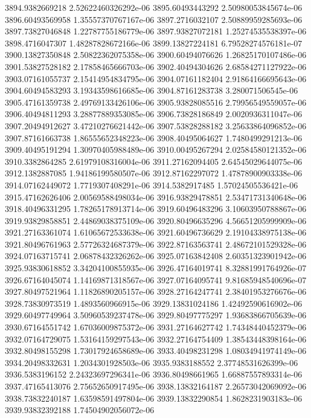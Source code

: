 {3894.9382669218 2.52622460326292e-06
3895.60493443292 2.50980053845674e-06
3896.60493569958 1.35557370767167e-06
3897.2716032107 2.50889959285693e-06
3897.73827046848 1.22787755186779e-06
3897.93827072181 1.25274535538397e-06
3898.4716047307 1.48287828672166e-06
3899.13827224181 6.79528274576181e-07
3900.13827350848 2.50822362075358e-06
3900.60494076626 1.26825170107486e-06
3901.53827528182 2.17858465666703e-06
3902.40494304626 2.68584271127922e-06
3903.07161055737 2.15414954834795e-06
3904.07161182404 2.91864166695643e-06
3904.60494583293 3.19343598616685e-06
3904.87161283738 3.280071506545e-06
3905.47161359738 2.49769133426106e-06
3905.93828085516 2.79956549559057e-06
3906.40494811293 3.28877889353085e-06
3906.73828186849 2.0020936311047e-06
3907.20494912627 3.47210276621442e-06
3907.53828288182 3.25633864096852e-06
3907.87161663738 1.86555652348223e-06
3908.40495064627 1.7480499291213e-06
3909.40495191294 1.30970405988489e-06
3910.00495267294 2.02584580121352e-06
3910.3382864285 2.61979108316004e-06
3911.27162094405 2.64545029644075e-06
3912.1382887085 1.94186199580507e-06
3912.87162297072 1.47878900903338e-06
3914.07162449072 1.7719307408291e-06
3914.5382917485 1.57024505536421e-06
3915.47162626406 2.00569588498034e-06
3916.93829478851 2.53471731340648e-06
3918.40496331295 1.78265178913714e-06
3919.60496483296 3.10603950788867e-06
3919.93829858851 2.44869038375109e-06
3920.80496635296 4.56651205999909e-06
3921.27163361074 1.61065672533638e-06
3921.60496736629 2.19104338975138e-06
3921.80496761963 2.57726324687379e-06
3922.87163563741 2.48672101529328e-06
3924.07163715741 2.06878432326262e-06
3925.07163842408 2.60351323901942e-06
3925.93830618852 3.34204100855935e-06
3926.47164019741 8.32881991764926e-07
3926.67164045074 1.14169871318567e-06
3927.07164095741 9.81685948540696e-07
3927.80497521964 1.11826890205157e-06
3928.27164247741 2.38401953276676e-06
3928.73830973519 1.4893560966915e-06
3929.13831024186 1.42492590616902e-06
3929.60497749964 3.50960539237478e-06
3929.80497775297 1.93683866705639e-06
3930.67164551742 1.67036009875372e-06
3931.27164627742 1.74348440452379e-06
3932.07164729075 1.53164159297543e-06
3932.27164754409 1.38543448398164e-06
3932.80498155298 1.73017924658689e-06
3933.40498231298 1.08034941974149e-06
3934.20498332631 1.2034301928503e-06
3935.9383188552 2.37748531626399e-06
3936.5383196152 2.24323697296341e-06
3936.80498661965 1.66887557893314e-06
3937.47165413076 2.75652650917495e-06
3938.13832164187 2.26573042069092e-06
3938.73832240187 1.63598591497804e-06
3939.13832290854 1.8628231903183e-06
3939.93832392188 1.74504902056072e-06
}
